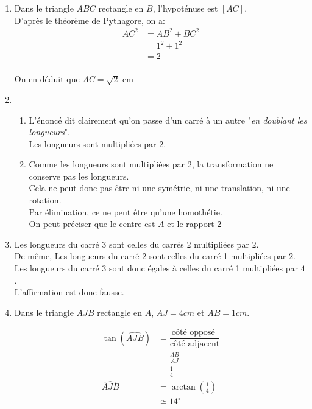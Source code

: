 


\begin{enumerate}

	\item Dans le triangle $ABC$ rectangle en $B$, l'hypoténuse est $[AC]$.\\

	D'après le théorème de Pythagore, on a:
	\begin{align*}
		AC^2&=AB^2+BC^2\\
		&=1^2+1^2\\
		&=2\\
	\end{align*}

	On en déduit que $AC=	\sqrt{2}$ cm

	\item

	\begin{enumerate}

		\item L'énoncé dit clairement qu'on passe d'un carré à un autre "\textit{en doublant les longueurs}".\\

		Les longueurs sont multipliées par $2$.

		

		\item Comme les longueurs sont multipliées par $2$, la transformation ne conserve pas les longueurs.\\

		Cela ne peut donc pas être ni une symétrie, ni une translation, ni une rotation. \\Par élimination, ce ne peut être qu'une homothétie.\\

		On peut préciser que le centre est $A$ et le rapport $2$

	\end{enumerate}

	\item Les longueurs du carré 3 sont celles du carrés 2 multipliées par $2$.\\

	De même, Les longueurs du carré 2 sont celles du carré 1 multipliées par $2$.\\

	Les longueurs du carré 3 sont donc égales à celles du carré 1 multipliées par $4$.\\

	L'affirmation est donc fausse.

	\item Dans le triangle $AJB$ rectangle en $A$, $AJ=4cm$ et $AB=1cm$. 

	\begin{align*}
		\tan (\widehat{AJB})&=\dfrac{\text{côté opposé }}{\text{côté adjacent}}\\
		&=\frac{AB}{AJ}\\
		&=\frac{1}{4}\\
		\widehat{AJB}&=\arctan\left(\frac{1}{4}\right)\\
		&\simeq 14^\circ
	\end{align*}

	

\end{enumerate}



